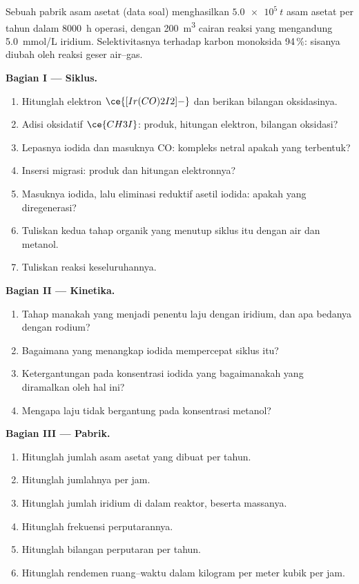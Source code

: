 \begin{problem}
\label{pb:b3:homogeneous-catalysis:1}
Sebuah pabrik asam asetat (data soal) menghasilkan $\qty{5.0e5}{t}$ asam asetat per tahun
dalam \qty{8000}{h} operasi, dengan \qty{200}{m^3} cairan reaksi yang mengandung \qty{5.0}{mmol/L}
iridium. Selektivitasnya terhadap karbon monoksida 94\,\%: sisanya diubah oleh
reaksi geser air--gas.

\medskip\noindent\textbf{Bagian I --- Siklus.}
\begin{enumerate}[beginpenalty=10000]
  \item Hitunglah elektron $\ce{[Ir(CO)2I2]-}$ dan berikan bilangan oksidasinya.
  \item Adisi oksidatif $\ce{CH3I}$: produk, hitungan elektron, bilangan oksidasi?
  \item Lepasnya iodida dan masuknya CO: kompleks netral apakah yang terbentuk?
  \item Insersi migrasi: produk dan hitungan elektronnya?
  \item Masuknya iodida, lalu eliminasi reduktif asetil iodida: apakah yang
        diregenerasi?
  \item Tuliskan kedua tahap organik yang menutup siklus itu dengan air dan metanol.
  \item Tuliskan reaksi keseluruhannya.
\end{enumerate}

\medskip\noindent\textbf{Bagian II --- Kinetika.}
\begin{enumerate}[resume, beginpenalty=10000]
  \item Tahap manakah yang menjadi penentu laju dengan iridium, dan apa bedanya dengan
        rodium?
  \item Bagaimana  yang menangkap iodida mempercepat siklus itu?
  \item Ketergantungan pada konsentrasi iodida yang bagaimanakah yang diramalkan oleh hal ini?
  \item Mengapa laju tidak bergantung pada konsentrasi metanol?
\end{enumerate}

\medskip\noindent\textbf{Bagian III --- Pabrik.}
\begin{enumerate}[resume, beginpenalty=10000]
  \item Hitunglah jumlah asam asetat yang dibuat per tahun.
  \item Hitunglah jumlahnya per jam.
  \item Hitunglah jumlah iridium di dalam reaktor, beserta massanya.
  \item Hitunglah frekuensi perputarannya.
  \item Hitunglah bilangan perputaran per tahun.
  \item Hitunglah rendemen ruang--waktu dalam kilogram per meter kubik per jam.
\end{enumerate}


\end{problem}
